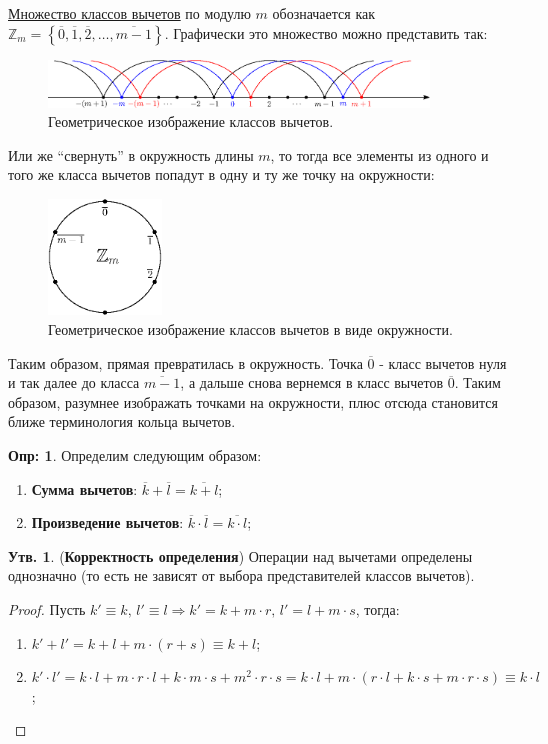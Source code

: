 \documentclass[12pt]{article}
\newcommand{\MZ}{\mathbb{Z}}
\theoremstyle{definition}
\newtheorem{defn}{Опр:}
\newtheorem{prop}{Утв.}
\newcommand{\ovl}[1]{\overline{#1}}
\begin{document}
\uline{Множество классов вычетов} по модулю $m$ обозначается как $\MZ_m = \left\{\ovl{0},\ovl{1},\ovl{2},\dotsc, \ovl{m-1}\right\}$. Графически это множество можно представить так:
\begin{figure}[H]
	\centering
	\includegraphics[width=0.9\textwidth]{AL1L12_1.eps}
	\caption{Геометрическое изображение классов вычетов.}
	\label{12_1}
\end{figure}
Или же ``свернуть'' в окружность длины $m$, то тогда все элементы из одного и того же класса вычетов попадут в одну и ту же точку на окружности:
\begin{figure}[H]
	\centering
	\includegraphics[width=0.27\textwidth]{AL1L12_2.eps}
	\caption{Геометрическое изображение классов вычетов в виде окружности.}
	\label{12_2}
\end{figure}
Таким образом, прямая превратилась в окружность. Точка $\ovl{0}$ - класс вычетов нуля и так далее до класса $\ovl{m-1}$, а дальше снова вернемся в класс вычетов $\ovl{0}$. Таким образом, разумнее изображать точками на окружности, плюс отсюда становится ближе терминология кольца вычетов.

\begin{defn}
	Определим  следующим образом:
	\begin{enumerate}[label =\arabic*)]
		\item \textbf{Сумма вычетов}: $\ovl{k} + \ovl{l} = \ovl{k+l}$;
		\item \textbf{Произведение вычетов}: $\ovl{k}{\cdot}\ovl{l} = \ovl{k{\cdot}l}$;
	\end{enumerate}
\end{defn}

\begin{prop}(\textbf{Корректность определения})
	Операции над вычетами определены однозначно (то есть не зависят от выбора представителей классов вычетов).
\end{prop}
\begin{proof}
	Пусть $k' \equiv k, \, l' \equiv l \Rightarrow k' = k + m{\cdot}r, \, l' = l +m{\cdot}s$, тогда: 
	\begin{enumerate}[label =\arabic*)]
		\item $k' + l' = k + l + m{\cdot}(r + s) \equiv k + l$;
		\item $k'{\cdot}l' = k{\cdot}l + m{\cdot}r{\cdot}l + k{\cdot}m{\cdot}s + m^2{\cdot}r{\cdot}s = k{\cdot}l + m{\cdot}(r{\cdot}l + k{\cdot}s + m{\cdot}r{\cdot}s) \equiv k{\cdot}l$;
	\end{enumerate}
\end{proof}
\end{document}
